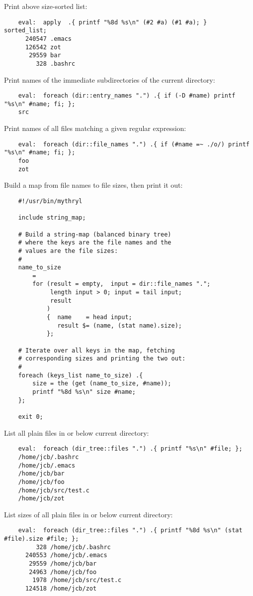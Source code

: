 Print above size-sorted list:
\begin{verbatim}
    eval:  apply  .{ printf "%8d %s\n" (#2 #a) (#1 #a); }  sorted_list;
      240547 .emacs
      126542 zot
       29559 bar
         328 .bashrc
\end{verbatim}

Print names of the immediate subdirectories of the current directory:
\begin{verbatim}
    eval:  foreach (dir::entry_names ".") .{ if (-D #name) printf "%s\n" #name; fi; };
    src
\end{verbatim}

Print names of all files matching a given regular expression:
\begin{verbatim}
    eval:  foreach (dir::file_names ".") .{ if (#name =~ ./o/) printf "%s\n" #name; fi; };
    foo
    zot
\end{verbatim}

Build a map from file names to file sizes, then print it out:
\begin{verbatim}
    #!/usr/bin/mythryl

    include string_map;

    # Build a string-map (balanced binary tree)
    # where the keys are the file names and the
    # values are the file sizes:
    #
    name_to_size
        =
        for (result = empty,  input = dir::file_names ".";
             length input > 0; input = tail input;
             result
            )
            {  name    = head input;
               result $= (name, (stat name).size);
            };

    # Iterate over all keys in the map, fetching
    # corresponding sizes and printing the two out:
    #
    foreach (keys_list name_to_size) .{
        size = the (get (name_to_size, #name));
        printf "%8d %s\n" size #name;
    };

    exit 0;
\end{verbatim}


List all plain files in or below current directory:
\begin{verbatim}
    eval:  foreach (dir_tree::files ".") .{ printf "%s\n" #file; };
    /home/jcb/.bashrc
    /home/jcb/.emacs
    /home/jcb/bar
    /home/jcb/foo
    /home/jcb/src/test.c
    /home/jcb/zot
\end{verbatim}

List sizes of all plain files in or below current directory:
\begin{verbatim}
    eval:  foreach (dir_tree::files ".") .{ printf "%8d %s\n" (stat #file).size #file; };
         328 /home/jcb/.bashrc
      240553 /home/jcb/.emacs
       29559 /home/jcb/bar
       24963 /home/jcb/foo
        1978 /home/jcb/src/test.c
      124518 /home/jcb/zot
\end{verbatim}

